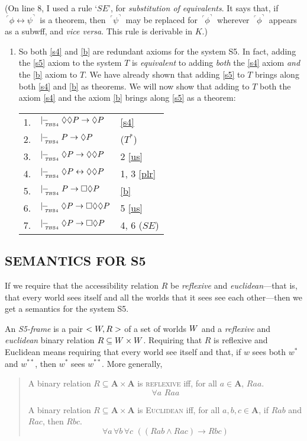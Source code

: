 \documentclass[landscape, two column, full page,reqno]{article}
\let\mathcal\relax
\newcommand{\mathcal}{\OMScal}%
\newcommand{\qd}{\begin{quote}\begin{description}  [align=left,style=nextline,leftmargin=*,labelsep=0pt,font=\normalfont]}
\newcommand{\zd}{\end{description}\end{quote}}
\newcommand{\qe}{\begin{enumerate}[align=left,style=nextline,leftmargin=17pt,labelsep=5pt,font=\normalfont]}
\newcommand{\ze}{\end{enumerate}}
\newcommand{\p}{\item}
\newcommand{\e}{\emph}
\newcommand{\mbf}{\mathbf}
\newcommand{\s}{\textsc}
\newcommand{\fns}[1]{{\footnotesize #1}}
\newcommand{\qq}[1]{ ~\!^\ulcorner #1  ^\urcorner~\!}
\newcommand{\tbsfourproves}{\mid\hspace{-3.9pt}-_{\!\!\!\raisebox{-3pt}{\text{\tiny $T\!B$S4}}}\hspace{3pt}}
\newcommand{\ff}{\leftrightarrow}
\newcommand{\otto}{\leftrightarrow}
\newcommand{\D}{\Diamond}
\newcommand{\B}{\Box}
\newcommand{\hs}{\hspace{2pt}}
\newcommand{\aproof}[2]{\begin{center}
\begin{tabularx}{#1}{l X l}
#2
\end{tabularx}
\end{center}}
\begin{document}
(On line 8, I used a rule `$SE$', for \e{substitution of equivalents}.  It says that, if $\qq{\phi \otto \psi}$ is a theorem, then $\qq{\psi}$ may be replaced for $\qq{\phi}$ wherever $\qq{\phi}$ appears as a subwff, and \e{vice versa}.  This rule is derivable in $K$.)
	\qe
	\p So both \ref{s4} and \ref{b} are redundant axioms for the system S5.  In fact, adding the \ref{s5} axiom to the system $T$ is \e{equivalent} to adding \e{both} the \ref{s4} axiom \e{and} the \ref{b} axiom to $T$.  We have already shown that adding \ref{s5} to $T$ brings along both \ref{s4} and \ref{b} as theorems.  We will now show that adding  to $T$ both the axiom \ref{s4} and the axiom \ref{b}  brings along \ref{s5} as a theorem:
	\aproof{200pt}{
	1. & $\tbsfourproves \D \D P \to \D P$			& 	\eqref{s4}	\\
	2. & $\tbsfourproves  P \to \D P$					& 	($T^*$)	\\
	3. & $\tbsfourproves \D P \to \D \D P$			& 	2 \eqref{us}	\\
	4. & $\tbsfourproves  \D P \ff \D \D P$			& 1, 3 \eqref{plr}	\\
	5. & $\tbsfourproves P \to \B \D P$				& \eqref{b}		\\
	6. & $\tbsfourproves \D P \to \B \D \D P$			& 5 \eqref{us}	\\
	7. & $\tbsfourproves \D P \to \B \D P$			& 4, 6 ($SE$)	
	}
	\ze 
	
\subsection{S\fns{EMANTICS} F\fns{OR} S5}

If we require that the accessibility relation $R$ be \e{reflexive} and \e{euclidean}---that is, that every world sees itself and all the worlds that it sees see each other---then we get a semantics for the system S5.

\p An \e{S5-frame} is a pair $< \mathcal{W}, R >$ of a set of worlds $\mathcal{W}$ and a \e{reflexive} and \e{euclidean} binary relation $R \subseteq \mathcal{W} \times \mathcal{W}$.  Requiring that $R$ is reflexive and Euclidean means requiring that every world see itself and that, if $w$ sees both $w^*$ and $w^{**}$, then $w^*$ sees $w^{**}$.  More generally,
	\qd
	\p[\s{reflexivity}] A binary relation $R \subseteq \mbf{A} \times \mbf{A}$ is \s{reflexive} iff, for all $a \in \mbf{A}$, $Raa$.
		\[
		\forall a \hs\hs Raa
		\]
	\p[\s{Euclideaness}] A binary relation $R \subseteq \mbf{A} \times \mbf{A}$ is \s{Euclidean} iff, for all $a, b, c \in \mbf{A}$, if $Rab$ and $Rac$, then $Rbc$.
		\[
		\forall a \hs \forall b \hs \forall c \hs\hs ((R ab \wedge Rac) \to Rbc)
		\]
	\zd
\end{document}
